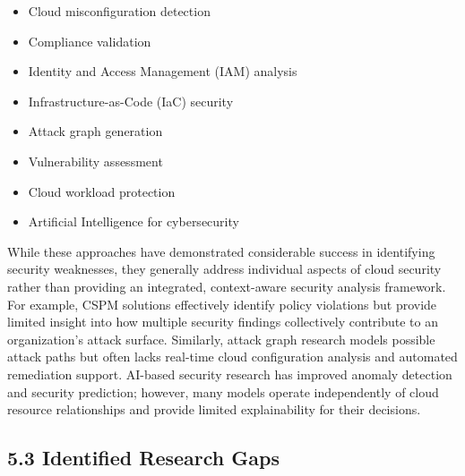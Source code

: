 \begin{itemize}
\tightlist
\item
  Cloud misconfiguration detection\\
\item
  Compliance validation\\
\item
  Identity and Access Management (IAM) analysis\\
\item
  Infrastructure-as-Code (IaC) security\\
\item
  Attack graph generation\\
\item
  Vulnerability assessment\\
\item
  Cloud workload protection\\
\item
  Artificial Intelligence for cybersecurity
\end{itemize}

While these approaches have demonstrated considerable success in identifying security weaknesses, they generally address individual aspects of cloud security rather than providing an integrated, context-aware security analysis framework. For example, CSPM solutions effectively identify policy violations but provide limited insight into how multiple security findings collectively contribute to an organization's attack surface. Similarly, attack graph research models possible attack paths but often lacks real-time cloud configuration analysis and automated remediation support. AI-based security research has improved anomaly detection and security prediction; however, many models operate independently of cloud resource relationships and provide limited explainability for their decisions.

\subsection{5.3 Identified Research Gaps}

